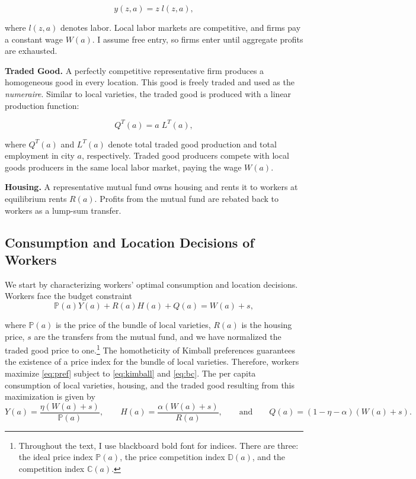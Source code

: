 \begin{equation}\label{eq:prodfnt}
	y(z,a) = z \; l(z,a),
\end{equation}  

where $l(z,a)$ denotes labor. Local labor markets are competitive, and firms pay a constant wage $W(a)$. I assume free entry, so firms enter until aggregate profits are exhausted.

\textbf{Traded Good.} A perfectly competitive representative firm produces a homogeneous good in every location. This good is freely traded and used as the \textit{numeraire}. Similar to local varieties, the traded good is produced with a linear production function:  

\begin{equation}\label{eq:prodft}
	Q^T(a) = a \; L^T(a),
\end{equation}  

where $Q^T(a)$ and $L^T(a)$ denote total traded good production and total employment in city $a$, respectively. Traded good producers compete with local goods producers in the same local labor market, paying the wage $W(a)$.  

\textbf{Housing.} A representative mutual fund owns housing and rents it to workers at equilibrium rents $R(a)$. Profits from the mutual fund are rebated back to workers as a lump-sum transfer.

\subsection{Consumption and Location Decisions of Workers}
We start by characterizing workers' optimal consumption and location decisions. Workers face the budget constraint 
\begin{equation}\label{eq:bc}
	\mathbb{P}(a)Y(a) + R(a) H(a) + Q(a) = W(a) + s,
\end{equation}  

where $\mathbb{P}(a)$ is the price of the bundle of local varieties, $R(a)$ is the housing price, $s$ are the transfers from the mutual fund, and we have normalized the traded good price to one.\footnote{Throughout the text, I use blackboard bold font for indices. There are three: the ideal price index $\mathbb{P}(a)$, the price competition index $\mathbb{D}(a)$, and the competition index $\mathbb{C}(a)$.} The homotheticity of Kimball preferences guarantees the existence of a price index for the bundle of local varieties. Therefore, workers maximize \eqref{eq:pref} subject to \eqref{eq:kimball} and \eqref{eq:bc}. The per capita consumption of local varieties, housing, and the traded good resulting from this maximization is given by  
\begin{equation}\label{eq:consumption}
	Y(a) =  \frac{\eta (W(a)+s)}{\mathbb{P}(a)}, \qquad H(a) =  \frac{\alpha (W(a)+s)}{R(a)}, \qquad \text{and} \qquad Q(a) = (1-\eta - \alpha) (W(a)+s).
\end{equation}

